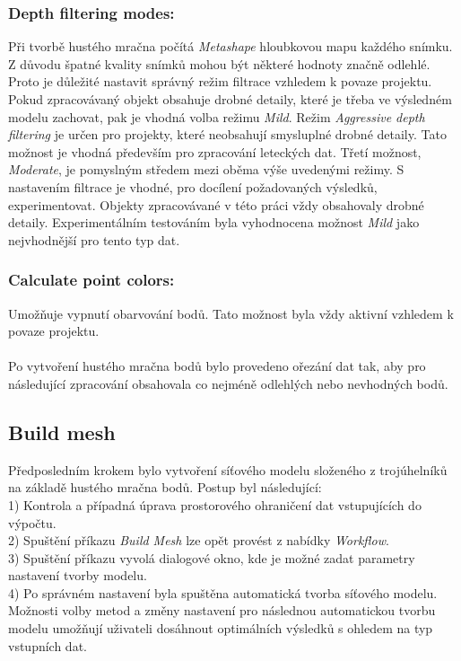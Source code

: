 \documentclass[a4paper, 12pt]{report}
\begin{document}
\subsubsection*{Depth filtering modes:}
Při tvorbě hustého mračna počítá \textit{Metashape} hloubkovou mapu každého snímku. Z důvodu špatné kvality snímků mohou být některé hodnoty značně odlehlé. Proto je důležité  nastavit správný režim filtrace vzhledem k povaze projektu. Pokud zpracovávaný objekt obsahuje drobné detaily, které je třeba ve výsledném modelu zachovat, pak je vhodná volba režimu \textit{Mild}. Režim \textit{Aggressive depth filtering} je určen pro projekty, které neobsahují smysluplné drobné detaily. Tato možnost je vhodná především pro zpracování leteckých dat. Třetí možnost, \textit{Moderate}, je pomyslným středem mezi oběma výše uvedenými režimy. S nastavením filtrace je vhodné, pro docílení požadovaných výsledků, experimentovat. Objekty zpracovávané v této práci vždy obsahovaly drobné detaily. Experimentálním testováním byla vyhodnocena možnost \textit{Mild} jako nejvhodnější pro tento typ dat. 

\subsubsection*{Calculate point colors:}
Umožňuje vypnutí obarvování bodů. Tato možnost byla vždy aktivní vzhledem k povaze projektu.\\
\\
Po vytvoření hustého mračna bodů bylo provedeno ořezání dat tak, aby pro následující zpracování obsahovala co nejméně odlehlých nebo nevhodných bodů. 

\subsection{Build mesh}
Předposledním krokem bylo vytvoření síťového modelu složeného z trojúhelníků na základě hustého mračna bodů. Postup byl následující:\\
1) Kontrola a případná úprava prostorového ohraničení dat vstupujících do výpočtu. \\
2) Spuštění příkazu \textit{Build Mesh} lze opět provést z nabídky \textit{Workflow}.\\
3) Spuštění příkazu vyvolá dialogové okno, kde je možné zadat parametry nastavení tvorby modelu. \\
4) Po správném nastavení byla spuštěna automatická tvorba síťového modelu. \\
Možnosti volby metod a změny nastavení pro následnou automatickou tvorbu modelu umožňují uživateli dosáhnout optimálních výsledků s ohledem na typ vstupních dat.
\end{document}
